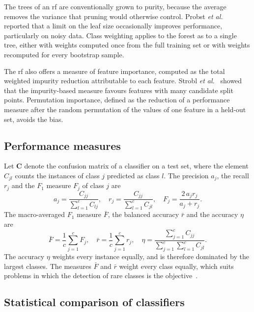 The trees of an \gls{rf} are conventionally grown to purity, because the
average removes the variance that pruning would otherwise control. Probst
\textit{et al.}~\cite{probst2019} reported that a limit on the leaf size
occasionally improves performance, particularly on noisy data. Class
weighting applies to the forest as to a single tree, either with weights
computed once from the full training set or with weights recomputed for
every bootstrap sample.

The \gls{rf} also offers a measure of feature importance, computed as the
total weighted impurity reduction attributable to each feature. Strobl
\textit{et al.}~\cite{strobl2007} showed that the impurity-based measure
favours features with many candidate split points. Permutation importance,
defined as the reduction of a performance measure after the random
permutation of the values of one feature in a held-out set, avoids the bias.

\subsection{Performance measures}
\label{sec:bg-measures}

Let $\mathbf{C}$ denote the confusion matrix of a classifier on a test set,
where the element $C_{jl}$ counts the instances of class $j$ predicted as
class $l$. The precision $a_j$, the recall $r_j$ and the $F_1$ measure
$F_j$ of class $j$ are
\begin{equation}
a_j = \frac{C_{jj}}{\sum_{l=1}^{c} C_{lj}}, \quad
r_j = \frac{C_{jj}}{\sum_{l=1}^{c} C_{jl}}, \quad
F_j = \frac{2\,a_j r_j}{a_j + r_j}.
\label{eq:prf}
\end{equation}
The macro-averaged $F_1$ measure $\bar{F}$, the balanced accuracy $\bar{r}$
and the accuracy $\eta$ are
\begin{equation}
\bar{F} = \frac{1}{c}\sum_{j=1}^{c} F_j, \quad
\bar{r} = \frac{1}{c}\sum_{j=1}^{c} r_j, \quad
\eta = \frac{\sum_{j=1}^{c} C_{jj}}{\sum_{j=1}^{c}\sum_{l=1}^{c} C_{jl}}.
\label{eq:macro}
\end{equation}
The accuracy $\eta$ weights every instance equally, and is therefore
dominated by the largest classes. The measures $\bar{F}$ and $\bar{r}$
weight every class equally, which suits problems in which the detection of
rare classes is the objective~\cite{sokolova2009}.

\subsection{Statistical comparison of classifiers}
\label{sec:bg-stats}

